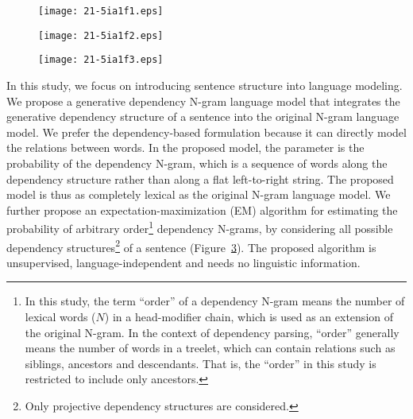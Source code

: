 \documentclass[english]{jnlp_1.4}
\begin{document}
\begin{figure}[b]
\begin{center}
\texttt{[image: 21-5ia1f1.eps]}
\end{center}
\label{n-gram}
\end{figure}
\begin{figure}[b]
\begin{center}
\texttt{[image: 21-5ia1f2.eps]}
\end{center}
\label{tree}
\end{figure}
\begin{figure}[b]
\begin{center}
\texttt{[image: 21-5ia1f3.eps]}
\end{center}
\label{dep-n-gram}
\end{figure}

In this study, we focus on introducing sentence structure into language modeling. We propose a generative dependency N-gram language model that integrates the generative dependency structure of a sentence into the original N-gram language model.
We prefer the dependency-based formulation because it can directly model the relations between words. 
In the proposed model, the parameter is the probability of the dependency N-gram, which is a sequence of words along the dependency structure rather than along a flat left-to-right string. 
The proposed model is thus as completely lexical as the original N-gram language model.
We further propose an expectation-maximization (EM) algorithm for estimating the probability of arbitrary order\footnote{In this study, the term ``order'' of a dependency N-gram means the number of lexical words ($N$) in a head-modifier chain, which is used as an extension of the original N-gram. In the context of dependency parsing, ``order'' generally means the number of words in a treelet, which can contain relations such as  siblings, ancestors and descendants. That is, the ``order'' in this study is restricted to include only ancestors.} dependency N-grams, by considering all possible dependency structures\footnote {Only projective dependency structures are considered.} of a sentence (Figure~\ref{dep-n-gram}). 
The proposed algorithm is unsupervised, language-independent and needs no linguistic information.
\end{document}
